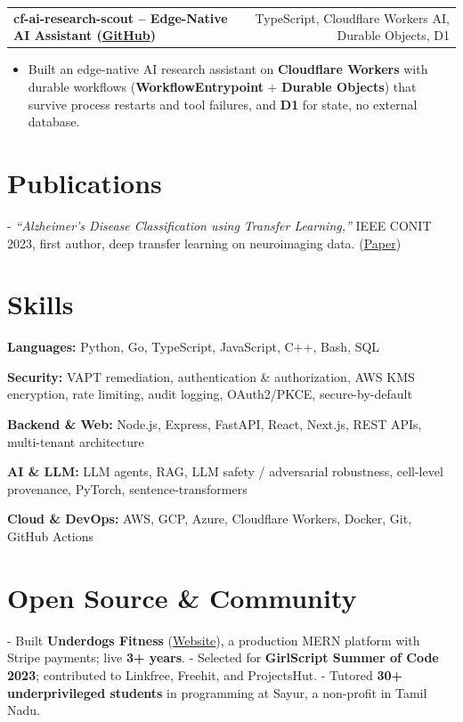 \documentclass[letterpaper,11pt]{article}
\makeatletter
\newcommand{\projItem}[2]{%
  \vspace{2pt}
  \begin{tabular*}{\textwidth}{@{}l@{\extracolsep{\fill}}r@{}}
    \textbf{#1} & #2 \\
  \end{tabular*}\par\vspace{-3pt}
}
\newcommand{\skillLine}[2]{\textbf{#1:} #2\par\vspace{1.5pt}}
\newcommand{\inlineBlock}[1]{{\setlength{\leftskip}{0.18in}\small #1\par}}
\makeatother
\begin{document}
\projItem{cf-ai-research-scout -- Edge-Native AI Assistant {\normalfont\small(\href{https://github.com/Deva-1903/cf_ai_research_scout}{GitHub})}}{TypeScript, Cloudflare Workers AI, Durable Objects, D1}
\begin{itemize}
  \item Built an edge-native AI research assistant on \textbf{Cloudflare Workers} with durable workflows (\textbf{WorkflowEntrypoint} + \textbf{Durable Objects}) that survive process restarts and tool failures, and \textbf{D1} for state, no external database.
\end{itemize}

\section{Publications}
\vspace{2pt}
\inlineBlock{- \textit{``Alzheimer's Disease Classification using Transfer Learning,''} IEEE CONIT 2023, first author, deep transfer learning on neuroimaging data. {\normalfont\small(\href{https://ieeexplore.ieee.org/document/10205760}{Paper})}}

\section{Skills}
\skillLine{Languages}{Python, Go, TypeScript, JavaScript, C++, Bash, SQL}
\skillLine{Security}{VAPT remediation, authentication \& authorization, AWS KMS encryption, rate limiting, audit logging, OAuth2/PKCE, secure-by-default}
\skillLine{Backend \& Web}{Node.js, Express, FastAPI, React, Next.js, REST APIs, multi-tenant architecture}
\skillLine{AI \& LLM}{LLM agents, RAG, LLM safety / adversarial robustness, cell-level provenance, PyTorch, sentence-transformers}
\skillLine{Cloud \& DevOps}{AWS, GCP, Azure, Cloudflare Workers, Docker, Git, GitHub Actions}

\section{Open Source \& Community}
\inlineBlock{- Built \textbf{Underdogs Fitness} (\href{https://www.underdogsfitness.in/}{Website}), a production MERN platform with Stripe payments; live \textbf{3+ years}. - Selected for \textbf{GirlScript Summer of Code 2023}; contributed to Linkfree, Freehit, and ProjectsHut. - Tutored \textbf{30+ underprivileged students} in programming at Sayur, a non-profit in Tamil Nadu.}
\end{document}
